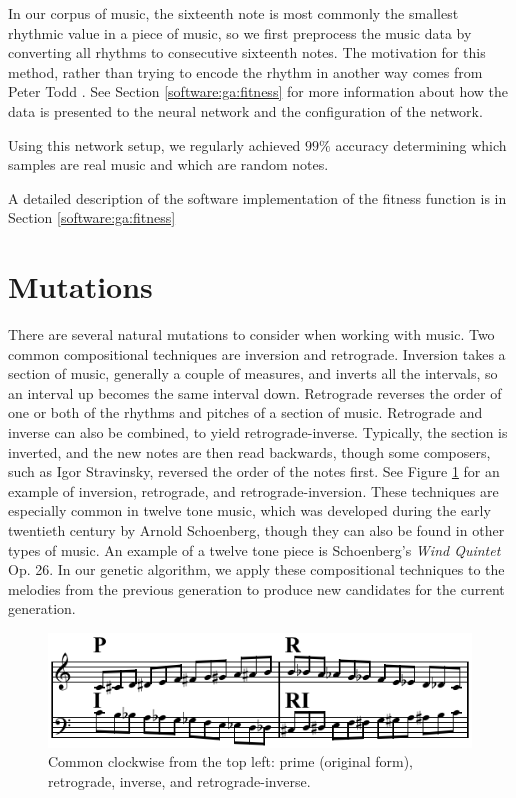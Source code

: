 In our corpus of music, the sixteenth note is most commonly the smallest rhythmic value in a piece of music, so we first preprocess the music data by converting all rhythms to consecutive sixteenth notes.
The motivation for this method, rather than trying to encode the rhythm in another way comes from Peter Todd \cite{todd_connectionist_1989}.
See Section \ref{software:ga:fitness} for more information about how the data is presented to the neural network and the configuration of the network.

Using this network setup, we regularly achieved $99\%$ accuracy determining which samples are real music and which are random notes.

A detailed description of the software implementation of the fitness function is in Section \ref{software:ga:fitness}

\section{Mutations} \label{ga:mutate}

There are several natural mutations to consider when working with music.
Two common compositional techniques are inversion and retrograde.
Inversion takes a section of music, generally a couple of measures, and inverts all the intervals, so an interval up becomes the same interval down.
Retrograde reverses the order of one or both of the rhythms and pitches of a section of music.
Retrograde and inverse can also be combined, to yield retrograde-inverse.
Typically, the section is inverted, and the new notes are then read backwards, though some composers, such as Igor Stravinsky, reversed the order of the notes first.
See Figure \ref{fig:p-r-i-ri} for an example of inversion, retrograde, and retrograde-inversion.
These techniques are especially common in twelve tone music, which was developed during the early twentieth century by Arnold Schoenberg, though they can also be found in other types of music.
An example of a twelve tone piece is Schoenberg's \textit{Wind Quintet} Op. 26.
In our genetic algorithm, we apply these compositional techniques to the melodies from the previous generation to produce new candidates for the current generation.

\begin{figure}
	\centering
	\includegraphics[width=\linewidth]{figures/P-R-I-RI.png} %
	\caption{Common  clockwise from the top left: prime (original form), retrograde, inverse, and retrograde-inverse.}
	\label{fig:p-r-i-ri}
\end{figure}

